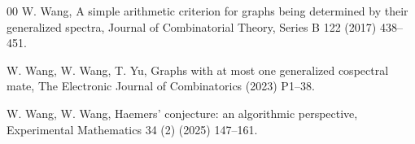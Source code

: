 \documentclass[12pt]{article}
\theoremstyle{plain}
\theoremstyle{definition}
\begin{document}
\begin{thebibliography}{00}
 W. Wang, A simple arithmetic criterion for graphs being determined by their generalized spectra, Journal of Combinatorial Theory, Series B 122 (2017) 438–451.

 W. Wang, W. Wang, T. Yu, Graphs with at most one generalized cospectral mate, The Electronic Journal of Combinatorics (2023) P1–38.

 W. Wang, W. Wang, Haemers’ conjecture: an algorithmic perspective, Experimental Mathematics 34 (2) (2025) 147–161.

\end{thebibliography}
\end{document}
